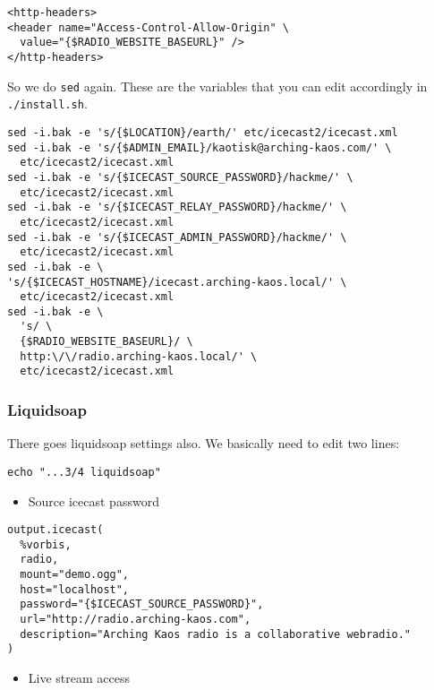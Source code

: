 \documentclass[12pt]{report}
\begin{document}
\begin{verbatim}
<http-headers>
<header name="Access-Control-Allow-Origin" \
  value="{$RADIO_WEBSITE_BASEURL}" />
</http-headers>
\end{verbatim}

So we do \texttt{sed} again. These are the variables that you can edit accordingly in \texttt{./install.sh}.

\begin{verbatim}
sed -i.bak -e 's/{$LOCATION}/earth/' etc/icecast2/icecast.xml
sed -i.bak -e 's/{$ADMIN_EMAIL}/kaotisk@arching-kaos.com/' \
  etc/icecast2/icecast.xml
sed -i.bak -e 's/{$ICECAST_SOURCE_PASSWORD}/hackme/' \
  etc/icecast2/icecast.xml
sed -i.bak -e 's/{$ICECAST_RELAY_PASSWORD}/hackme/' \
  etc/icecast2/icecast.xml
sed -i.bak -e 's/{$ICECAST_ADMIN_PASSWORD}/hackme/' \
  etc/icecast2/icecast.xml
sed -i.bak -e \
's/{$ICECAST_HOSTNAME}/icecast.arching-kaos.local/' \
  etc/icecast2/icecast.xml
sed -i.bak -e \
  's/ \
  {$RADIO_WEBSITE_BASEURL}/ \
  http:\/\/radio.arching-kaos.local/' \
  etc/icecast2/icecast.xml
\end{verbatim}


\subsubsection{Liquidsoap}\label{liquidsoap}

There goes liquidsoap settings also. We basically need to edit two lines:

\begin{verbatim}
echo "...3/4 liquidsoap"
\end{verbatim}

\begin{itemize}

\item
  Source icecast password
\end{itemize}

\begin{verbatim}
output.icecast(
  %vorbis,
  radio,
  mount="demo.ogg",
  host="localhost",
  password="{$ICECAST_SOURCE_PASSWORD}",
  url="http://radio.arching-kaos.com",
  description="Arching Kaos radio is a collaborative webradio."
)
\end{verbatim}

\begin{itemize}

\item
  Live stream access
\end{itemize}
\end{document}
